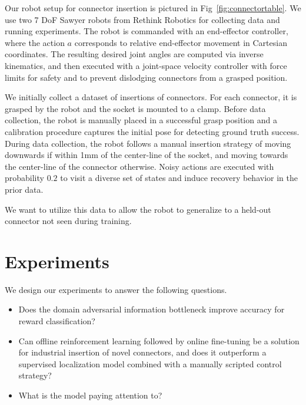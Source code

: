 Our robot setup for connector insertion is pictured in Fig~\ref{fig:connectortable}. We use two 7 DoF Sawyer robots from Rethink Robotics for collecting data and running experiments. The robot is commanded with an end-effector controller, where the action $a$ corresponds to relative end-effector movement in Cartesian coordinates. The resulting desired joint angles are computed via inverse kinematics, and then executed with a joint-space velocity controller with force limits for safety and to prevent dislodging connectors from a grasped position.

We initially collect a dataset of insertions of \numconnectors{} connectors. For each connector, it is grasped by the robot and the socket is mounted to a clamp. Before data collection, the robot is manually placed in a successful grasp position and a calibration procedure captures the initial pose for detecting ground truth success. During data collection, the robot follows a manual insertion strategy of moving downwards if within 1mm of the center-line of the socket, and moving towards the center-line of the connector otherwise. Noisy actions are executed with probability $0.2$ to visit a diverse set of states and induce recovery behavior in the prior data.

We want to utilize this data to allow the robot to generalize to a held-out connector not seen during training.


\section{Experiments}







We design our experiments to answer the following questions.
\begin{itemize}
    \item Does the domain adversarial information bottleneck improve accuracy for reward classification?
    \item Can offline reinforcement learning followed by online fine-tuning be a solution for industrial insertion of novel connectors, and does it outperform a supervised localization model combined with a manually scripted control strategy?
    \item What is the model paying attention to?
\end{itemize}

